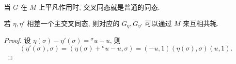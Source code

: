 \begin{rem*}
当 $G$ 在 $M$ 上平凡作用时, 交叉同态就是普通的同态.
\end{rem*}

\begin{lem}
若 $\eta, \eta'$ 相差一个主交叉同态,
则对应的 $G_\eta, G_{\eta'}$ 可以通过 $M$ 来互相共轭.
\end{lem}

\begin{proof}
设 $\eta(\sigma) - \eta'(\sigma) = {}^\sigma u - u$, 则
\[
(\eta'(\sigma),\sigma) = (\eta(\sigma) + {}^\sigma u - u, \sigma) = (-u, 1)(\eta(\sigma), \sigma)(u, 1).
\]
\end{proof}
